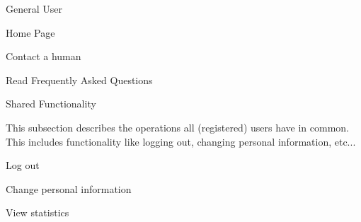 \begin{section}{General User}
\begin{subsection}{Home Page}
        \begin{subsubsection}{Contact a human}
        \end{subsubsection}

        \begin{subsubsection}{Read Frequently Asked Questions}
        \end{subsubsection}

    \end{subsection}

    \begin{subsection}{Shared Functionality}

        This subsection describes the operations all (registered) users have in
        common. This includes functionality like logging out, changing personal
        information, etc...

        \begin{subsubsection}{Log out}
        \end{subsubsection}

        \begin{subsubsection}{Change personal information}
        \end{subsubsection}

        \begin{subsubsection}{View statistics}
        \end{subsubsection}

    \end{subsection}

\end{section}


